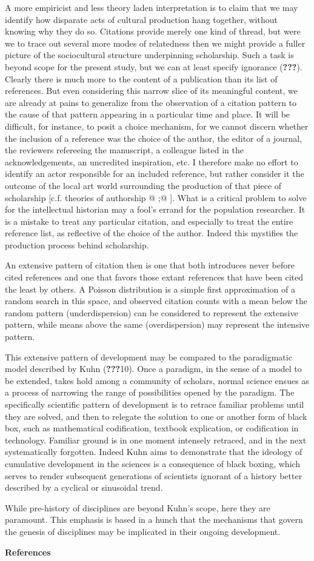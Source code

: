A more empiricist and less theory laden interpretation is to claim that
we may identify how disparate acts of cultural production hang together,
without knowing why they do so. Citations provide merely one kind of
thread, but were we to trace out several more modes of relatedness then
we might provide a fuller picture of the sociocultural structure
underpinning scholarship. Such a task is beyond scope for the present
study, but we can at least specify ignorance ({\textbf{???}}). Clearly
there is much more to the content of a publication than its list of
references. But even considering this narrow slice of its meaningful
content, we are already at pains to generalize from the observation of a
citation pattern to the cause of that pattern appearing in a particular
time and place. It will be difficult, for instance, to posit a choice
mechanism, for we cannot discern whether the inclusion of a reference
was the choice of the author, the editor of a journal, the reviewers
refereeing the manuscript, a colleague listed in the acknowledgements,
an uncredited inspiration, etc. I therefore make no effort to identify
an actor responsible for an included reference, but rather consider it
the outcome of the local art world surrounding the production of that
piece of scholarship {[}c.f. theories of authorship @ ;@ {]}. What is a
critical problem to solve for the intellectual historian may a fool's
errand for the population researcher. It is a mistake to treat any
particular citation, and especially to treat the entire reference list,
as reflective of the choice of the author. Indeed this mystifies the
production process behind scholarship.

An extensive pattern of citation then is one that both introduces never
before cited references and one that favors those extant references that
have been cited the least by others. A Poisson distribution is a simple
first approximation of a random search in this space, and observed
citation counts with a mean below the random pattern (underdispersion)
can be considered to represent the extensive pattern, while means above
the same (overdispersion) may represent the intensive pattern.

This extensive pattern of development may be compared to the
paradigmatic model described by Kuhn ({\textbf{???}}10). Once a
paradigm, in the sense of a model to be extended, takes hold among a
community of scholars, normal science ensues as a process of narrowing
the range of possibilities opened by the paradigm. The specifically
scientific pattern of development is to retrace familiar problems until
they are solved, and then to relegate the solution to one or another
form of black box, such as mathematical codification, textbook
explication, or codification in technology. Familiar ground is in one
moment intensely retraced, and in the next systematically forgotten.
Indeed Kuhn aims to demonstrate that the ideology of cumulative
development in the sciences is a consequence of black boxing, which
serves to render subsequent generations of scientists ignorant of a
history better described by a cyclical or sinusoidal trend.

While pre-history of disciplines are beyond Kuhn's scope, here they are
paramount. This emphasis is based in a hunch that the mechanisms that
govern the genesis of disciplines may be implicated in their ongoing
development.

\textbf{References}
